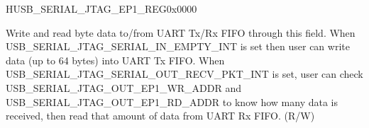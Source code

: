 \begin{register}{H}{USB\_SERIAL\_JTAG\_EP1\_REG}{0x0000}\label{regdesc:USBSERIALJTAGEP1REG}
%
%
\regnewline%
\begin{regdesc}\begin{reglist}
\label{fielddesc:USBSERIALJTAGRDWRBYTE}\item [USB\_SERIAL\_JTAG\_RDWR\_BYTE] Write and read byte data to/from UART Tx/Rx FIFO through this field. When USB\_SERIAL\_JTAG\_SERIAL\_IN\_EMPTY\_INT is set  then user can write data (up to 64 bytes) into UART Tx FIFO. When USB\_SERIAL\_JTAG\_SERIAL\_OUT\_RECV\_PKT\_INT is set, user can check USB\_SERIAL\_JTAG\_OUT\_EP1\_WR\_ADDR and USB\_SERIAL\_JTAG\_OUT\_EP1\_RD\_ADDR to know how many data is received, then read that amount of data from UART Rx FIFO. (R/W)
\end{reglist}\end{regdesc}
\end{register}


